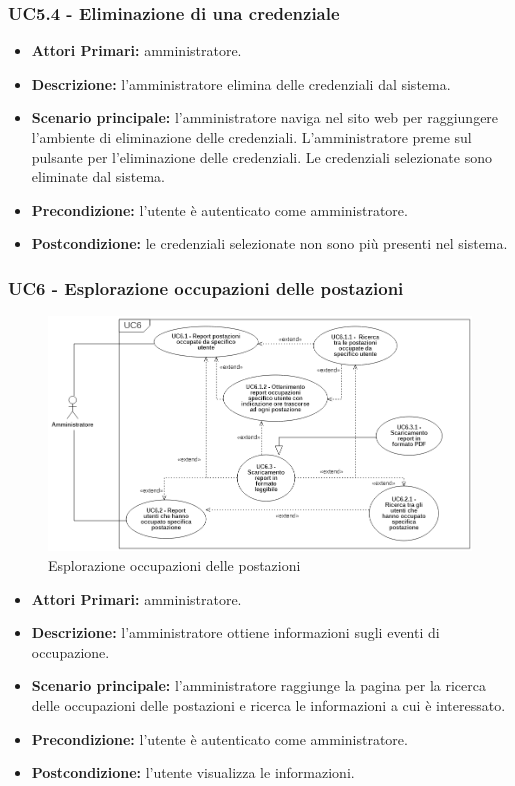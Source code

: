 \subsubsection{ UC5.4 - Eliminazione di una credenziale}
\begin{itemize}
	\item\textbf{Attori Primari:} 
	amministratore.
	\item\textbf{Descrizione:} 
	l'amministratore elimina delle credenziali dal sistema.
	\item\textbf{Scenario principale:} 
	l'amministratore naviga nel sito web per raggiungere l'ambiente di eliminazione delle credenziali.
	L'amministratore preme sul pulsante per l'eliminazione delle credenziali.
	Le credenziali selezionate sono eliminate dal sistema.
	\item\textbf{Precondizione:} 
	l'utente è autenticato come amministratore.
	\item\textbf{Postcondizione:}
	le credenziali selezionate non sono più presenti nel sistema.
\end{itemize}

\subsubsection{ UC6 - Esplorazione occupazioni delle postazioni}
\begin{figure}[H]
	\centering
	\includegraphics[width=18cm]{res/images/UC6.png}
	\caption{Esplorazione occupazioni delle postazioni}
	\label{fig:Esplorazione occupazioni delle postazioni}
\end{figure}
\begin{itemize}
	\item\textbf{Attori Primari:} 
	amministratore.
	\item\textbf{Descrizione:} 
	l'amministratore ottiene informazioni sugli eventi di occupazione.
	\item\textbf{Scenario principale:} 
	l'amministratore raggiunge la pagina per la ricerca delle occupazioni delle postazioni e ricerca le informazioni a cui è interessato.
	\item\textbf{Precondizione:} 
	l'utente è autenticato come amministratore.
	\item\textbf{Postcondizione:}
	l'utente visualizza le informazioni.
\end{itemize}

